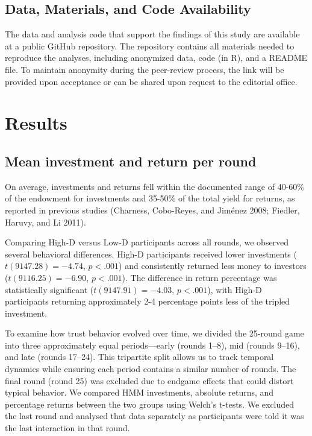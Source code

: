 \documentclass[
]{article}
\begin{document}
\subsection{Data, Materials, and Code Availability}\label{data-materials-and-code-availability}

The data and analysis code that support the findings of this study are available at a public GitHub repository. The repository contains all materials needed to reproduce the analyses, including anonymized data, code (in R), and a README file. To maintain anonymity during the peer-review process, the link will be provided upon acceptance or can be shared upon request to the editorial office.

\section{Results}\label{results}

\subsection{Mean investment and return per round}\label{mean-investment-and-return-per-round}

On average, investments and returns fell within the documented range of 40-60\% of the endowment for investments and 35-50\% of the total yield for returns, as reported in previous studies (Charness, Cobo-Reyes, and Jiménez 2008; Fiedler, Haruvy, and Li 2011).

Comparing High-D versus Low-D participants across all rounds, we observed several behavioral differences. High-D participants received lower investments (\(t(9147.28) = -4.74\), \(p < .001\)) and consistently returned less money to investors (\(t(9116.25) = -6.90\), \(p < .001\)). The difference in return percentage was statistically significant (\(t(9147.91) = -4.03\), \(p < .001\)), with High-D participants returning approximately 2-4 percentage points less of the tripled investment.

To examine how trust behavior evolved over time, we divided the 25-round game into three approximately equal periods---early (rounds 1--8), mid (rounds 9--16), and late (rounds 17--24). This tripartite split allows us to track temporal dynamics while ensuring each period contains a similar number of rounds. The final round (round 25) was excluded due to endgame effects that could distort typical behavior. We compared HMM investments, absolute returns, and percentage returns between the two groups using Welch's t-tests. We excluded the last round and analysed that data separately as participants were told it was the last interaction in that round.
\end{document}

